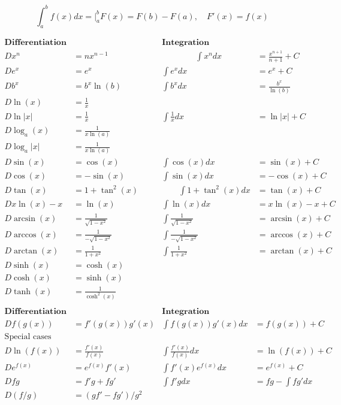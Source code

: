 \documentclass[12pt]{article}
\begin{document}
$$
\int_a^b f(x)dx=\bigg |_a^b F(x)=F(b)-F(a),\quad F'(x)=f(x)
$$

$$
\begin{array}{rl|rl}
\textbf{Differentiation} && \textbf{Integration}&\\[2mm]
Dx^n&=nx^{n-1}     \qquad\qquad&\qquad\qquad\int x^ndx&=\frac{x^{n+1}}{n+1}+C \\[2mm]
De^x&=e^x &\int e^xdx&=e^x+C\\[2mm]
Db^x&=b^x\ln(b) & \int b^xdx&=\frac{b^x}{\ln(b)}\\[2mm]
D\ln(x)&=\frac{1}{x} &&\\[2mm]
D\ln|x|&=\frac{1}{x} &\int\frac{1}{x}dx&=\ln|x|+C\\[2mm]
D\log_a(x)&=\frac{1}{x\ln(a)} &&\\[2mm]
D\log_a|x|&=\frac{1}{x\ln(a)} &&\\[2mm]
D\sin(x)&=\cos(x)   &\int\cos(x)dx&=\sin(x)+C\\[2mm]
D\cos(x)&=-\sin(x)  &\int\sin(x)dx&=-\cos(x)+C\\[2mm]
D\tan(x)&=1+\tan^2(x) \qquad&\qquad\int 1+\tan^2(x)dx&=\tan(x)+C\\[2mm]

Dx\ln(x)-x&=\ln(x) & \int\ln(x)dx&=x\ln(x)-x+C\\[10mm]

D\arcsin(x)&=\frac{1}{\sqrt{1-x^2}} & \int\frac{1}{\sqrt{1-x^2}}&=\arcsin(x)+C\\
D\arccos(x)&=\frac{1}{-\sqrt{1-x^2}} & \int\frac{1}{-\sqrt{1-x^2}}&=\arccos(x)+C\\
D\arctan(x)&=\frac{1}{1+x^2} & \int\frac{1}{1+x^2}&=\arctan(x)+C\\

D\sinh(x)&=\cosh(x) &&\\
D\cosh(x)&=\sinh(x) &&\\
D\tanh(x)&=\frac{1}{\cosh^2(x)} &&\\
\end{array}  
$$
\vspace{1cm}
$$
\begin{array}{rl|rl}
\textbf{Differentiation} && \textbf{Integration}&\\[2mm]
D f(g(x))&=f'(g(x))g'(x) & \int f(g(x))g'(x)dx&=f(g(x))+C\\[2mm]
\textrm{Special cases} &&&\\
D\ln(f(x))&=\frac{f'(x)}{f(x)} & \int \frac{f'(x)}{f(x)}dx&=\ln(f(x))+C\\[2mm]
D e^{f(x)}&=e^{f(x)}f'(x) & \int f'(x)e^{f(x)}dx&=e^{f(x)}+C\\[10mm]
D fg&=f'g+fg'& \int f'g dx&=fg-\int fg'dx\\[2mm]
D (f/g)&=(gf'-fg')/g^2 &&\\[2mm]
\end{array}  
$$
\end{document}
